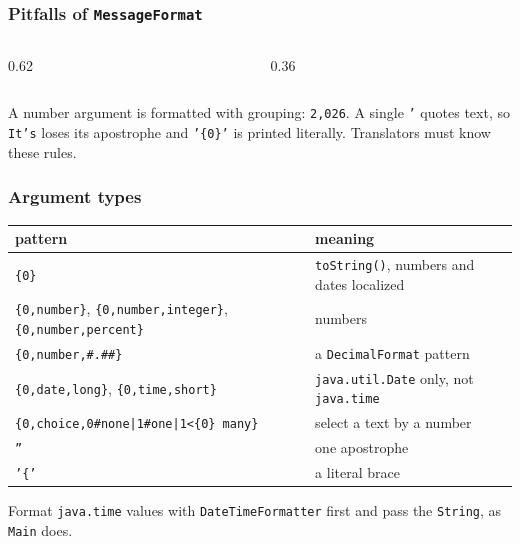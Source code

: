 \documentclass[aspectratio=169,10pt,compress]{beamer}
\begin{document}
\begin{frame}[t,fragile] \frametitle{Pitfalls of \texttt{MessageFormat}}
  \begin{columns}[T]
    \begin{column}{0.62\textwidth}
    \end{column}
    \begin{column}{0.36\textwidth}
    \end{column}
  \end{columns}

  \vspace{0.1em}
  \small A number argument is formatted with grouping: \texttt{2,026}. A single \texttt{'} quotes text, so
  \texttt{It's} loses its apostrophe and \texttt{'\{0\}'} is printed literally. Translators must know these rules.
\end{frame}




\begin{frame}[t,fragile] \frametitle{Argument types}
  \begin{center}\small
  \begin{tabular}{ll}
    \toprule
    \textbf{pattern} & \textbf{meaning} \\
    \midrule
    \texttt{\{0\}}                        & \texttt{toString()}, numbers and dates localized \\
    \texttt{\{0,number\}}, \texttt{\{0,number,integer\}}, \texttt{\{0,number,percent\}} & numbers \\
    \texttt{\{0,number,\#.\#\#\}}          & a \texttt{DecimalFormat} pattern \\
    \texttt{\{0,date,long\}}, \texttt{\{0,time,short\}} & \texttt{java.util.Date} only, not \texttt{java.time} \\
    \texttt{\{0,choice,0\#none|1\#one|1<\{0\} many\}} & select a text by a number \\
    \texttt{''}                           & one apostrophe \\
    \texttt{'\{'}                         & a literal brace \\
    \bottomrule
  \end{tabular}
  \end{center}
  \small Format \texttt{java.time} values with \texttt{DateTimeFormatter} first and pass the \texttt{String}, as \texttt{Main} does.
\end{frame}
\end{document}
